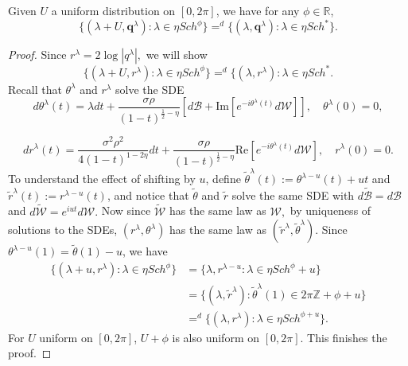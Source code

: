 \documentclass[10pt,a4paper]{amsart}
\begin{document}
\begin{lemma}\label{lemma3.6!}
    Given $U$ a uniform distribution on $[0,2\pi]$, we have for any $\phi\in\mathbb{R}$,
$$
\{(\lambda+U,\boldsymbol{q}^\lambda):\lambda\in\eta Sch^\phi\}=^d \{(\lambda,\boldsymbol{q}^\lambda):\lambda\in \eta Sch^*\}.$$
\end{lemma}

\begin{proof}
Since $r^\lambda=2\log|q^\lambda|,$ we will show 
$$
\{(\lambda+U,r^\lambda):\lambda\in \eta Sch^\phi\}=^d \{(\lambda,r^\lambda):\lambda\in \eta Sch^*.
$$
Recall that $\theta^\lambda$ and $r^\lambda$ solve the SDE
\begin{equation}
    d\theta^\lambda(t)=\lambda dt+\frac{\sigma\rho}{(1-t)^{\frac{1}{2}-\eta}}[d\mathcal{B}+\text{Im}[e^{-i\theta^\lambda(t)}d\mathcal{W}]],\quad \theta^\lambda(0)=0,
\end{equation}

\begin{equation}
dr^\lambda(t)=\frac{\sigma^2\rho^2}{4(1-t)^{1-2\eta}}dt+\frac{\sigma\rho}{(1-t)^{\frac{1}{2}-\eta}}\text{Re}[e^{-i\theta^\lambda(t)}d\mathcal{W}],\quad r^\lambda(0)=0.
\end{equation}
To understand the effect of shifting by $u$, define $\tilde{\theta}^\lambda(t):=\theta^{\lambda-u}(t)+ut$ and $\tilde{r}^\lambda(t):=r^{\lambda-u}(t)$, and notice that $\tilde{\theta}$ and $\tilde{r}$ solve the same SDE with $d\widetilde{\mathcal{B}}=d\mathcal{B}$ and $d\widetilde{\mathcal{W}}=e^{iut}d\mathcal{W}.$ 
    Now since $\widetilde{\mathcal{W}}$ has the same law as $\mathcal{W},$ by uniqueness of solutions to the SDEs, $(r^\lambda,\theta^\lambda)$ has the same law as $(\tilde{r}^\lambda,\tilde{\theta}^\lambda)$. Since $\theta^{\lambda-u}(1)=\tilde{\theta}(1)-u$, we have
$$ \begin{aligned}  \{(\lambda+u,r^\lambda):\lambda\in \eta Sch^\phi\}
&=\{\lambda,r^{\lambda-u}:\lambda\in\eta Sch^\phi+u\}
\\ &=\{(\lambda,\tilde{r}^\lambda):\tilde{\theta}^\lambda(1)\in 2\pi \mathbb{Z}+\phi+u\}
\\&=^d \{(\lambda,r^\lambda):\lambda\in \eta Sch^{\phi+u}\}. \end{aligned}
$$
    For $U$ uniform on $[0,2\pi]$, $U+\phi$ is also uniform on $[0,2\pi]$. This finishes the proof.
\end{proof}
\end{document}
